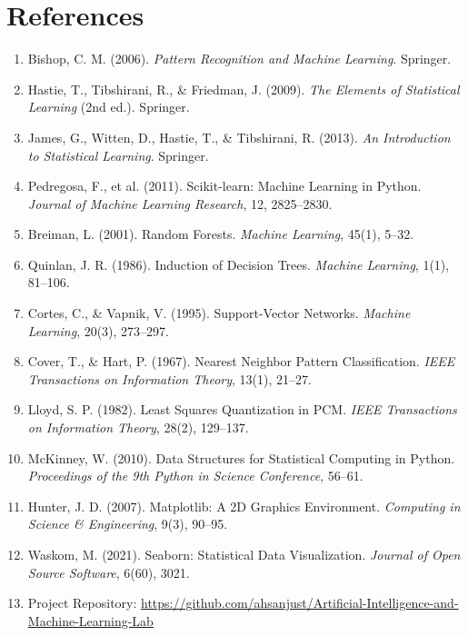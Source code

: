 \documentclass[11pt,a4paper]{article}
\begin{document}
\section{References}

\begin{enumerate}[leftmargin=*, itemsep=4pt]
    \item Bishop, C. M. (2006). \emph{Pattern Recognition and Machine
        Learning}. Springer.
    \item Hastie, T., Tibshirani, R., \& Friedman, J. (2009).
        \emph{The Elements of Statistical Learning} (2nd ed.). Springer.
    \item James, G., Witten, D., Hastie, T., \& Tibshirani, R. (2013).
        \emph{An Introduction to Statistical Learning}. Springer.
    \item Pedregosa, F., et al. (2011). Scikit-learn: Machine Learning
        in Python. \emph{Journal of Machine Learning Research}, 12,
        2825--2830.
    \item Breiman, L. (2001). Random Forests. \emph{Machine Learning},
        45(1), 5--32.
    \item Quinlan, J. R. (1986). Induction of Decision Trees.
        \emph{Machine Learning}, 1(1), 81--106.
    \item Cortes, C., \& Vapnik, V. (1995). Support-Vector Networks.
        \emph{Machine Learning}, 20(3), 273--297.
    \item Cover, T., \& Hart, P. (1967). Nearest Neighbor Pattern
        Classification. \emph{IEEE Transactions on Information Theory},
        13(1), 21--27.
    \item Lloyd, S. P. (1982). Least Squares Quantization in PCM.
        \emph{IEEE Transactions on Information Theory}, 28(2), 129--137.
    \item McKinney, W. (2010). Data Structures for Statistical Computing
        in Python. \emph{Proceedings of the 9th Python in Science
        Conference}, 56--61.
    \item Hunter, J. D. (2007). Matplotlib: A 2D Graphics Environment.
        \emph{Computing in Science \& Engineering}, 9(3), 90--95.
    \item Waskom, M. (2021). Seaborn: Statistical Data Visualization.
        \emph{Journal of Open Source Software}, 6(60), 3021.
    \item Project Repository:
        \url{https://github.com/ahsanjust/Artificial-Intelligence-and-Machine-Learning-Lab}
\end{enumerate}
\end{document}
